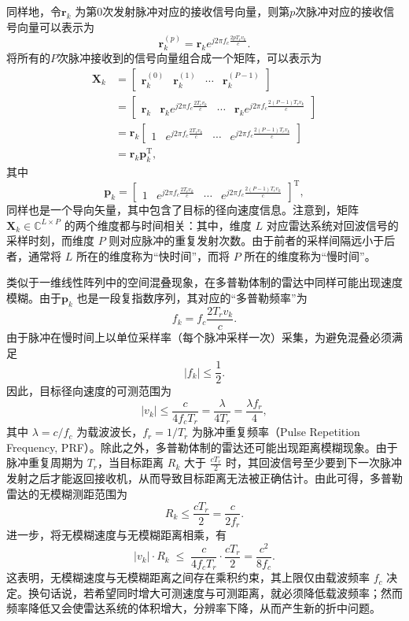 同样地，令\( \bm{r}_k \) 为第0次发射脉冲对应的接收信号向量，则第\( p \)次脉冲对应的接收信号向量可以表示为
\[
    \bm{r}_k^{(p)} = \bm{r}_k e^{j 2 \pi f_c \frac{2 p T_r v_k}{c}}.
\]
将所有的\( P \)次脉冲接收到的信号向量组合成一个矩阵，可以表示为
\[
    \begin{split}
        \mathbf{X}_k & = \begin{bmatrix}
                             \bm{r}_k^{(0)} & \bm{r}_k^{(1)} & \cdots & \bm{r}_k^{(P-1)}
                         \end{bmatrix}                                                             \\
                     & = \begin{bmatrix}
                             \bm{r}_k & \bm{r}_k e^{j 2 \pi f_c \frac{2 T_r v_k}{c}} & \cdots & \bm{r}_k e^{j 2 \pi f_c \frac{2 (P-1) T_r v_k}{c}}
                         \end{bmatrix} \\
                     & = \bm{r}_k \begin{bmatrix}
                                      1 & e^{j 2 \pi f_c \frac{2 T_r v_k}{c}} & \cdots & e^{j 2 \pi f_c \frac{2 (P-1) T_r v_k}{c}}
                                  \end{bmatrix}                 \\
                     & = \bm{r}_k \bm{p}_k^{\mathrm{T}},
    \end{split}
\]
其中
\[
    \bm{p}_k = \begin{bmatrix}
        1 & e^{j 2 \pi f_c \frac{2 T_r v_k}{c}} & \cdots & e^{j 2 \pi f_c \frac{2 (P-1) T_r v_k}{c}}
    \end{bmatrix}^{\mathrm{T}},
\]
同样也是一个导向矢量，其中包含了目标的径向速度信息。注意到，矩阵 \( \mathbf{X}_k \in \mathbb{C}^{L \times P} \) 的两个维度都与时间相关：其中，维度 \(L\) 对应雷达系统对回波信号的采样时刻，而维度 \(P\) 则对应脉冲的重复发射次数。由于前者的采样间隔远小于后者，通常将 \(L\) 所在的维度称为“快时间”，而将 \(P\) 所在的维度称为“慢时间”。

类似于一维线性阵列中的空间混叠现象，在多普勒体制的雷达中同样可能出现速度模糊。由于\(\bm{p}_k\) 也是一段复指数序列，其对应的“多普勒频率”为
\[
    f_k = f_c \frac{2 T_r v_k}{c}.
\]
由于脉冲在慢时间上以单位采样率（每个脉冲采样一次）采集，为避免混叠必须满足
\[
    |f_k| \leq \frac{1}{2}.
\]
因此，目标径向速度的可测范围为
\[
    |v_k| \leq \frac{c}{4 f_c T_r}
    = \frac{\lambda}{4 T_r}
    = \frac{\lambda f_r}{4},
\]
其中 \(\lambda = c/f_c\) 为载波波长，\(f_r = 1/T_r\) 为脉冲重复频率（Pulse Repetition Frequency, PRF）。除此之外，多普勒体制的雷达还可能出现距离模糊现象。由于脉冲重复周期为 \(T_r\)，当目标距离 \(R_k\) 大于 \(\tfrac{c T_r}{2}\) 时，其回波信号至少要到下一次脉冲发射之后才能返回接收机，从而导致目标距离无法被正确估计。由此可得，多普勒雷达的无模糊测距范围为
\[
    R_k \leq \frac{c T_r}{2} = \frac{c}{2 f_r}.
\]
进一步，将无模糊速度与无模糊距离相乘，有
\[
    |v_k| \cdot R_k \;\leq\;
    \frac{c}{4 f_c T_r} \cdot \frac{c T_r}{2}
    = \frac{c^2}{8 f_c}.
\]
这表明，无模糊速度与无模糊距离之间存在乘积约束，其上限仅由载波频率 \(f_c\) 决定。换句话说，若希望同时增大可测速度与可测距离，就必须降低载波频率；然而频率降低又会使雷达系统的体积增大，分辨率下降，从而产生新的折中问题。

